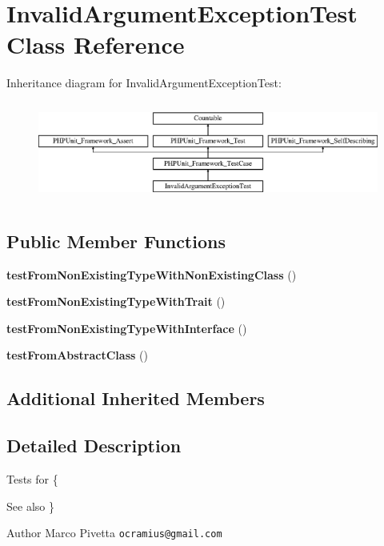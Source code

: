\section{Invalid\+Argument\+Exception\+Test Class Reference}
\label{class_doctrine_test_1_1_instantiator_test_1_1_exception_1_1_invalid_argument_exception_test}
Inheritance diagram for Invalid\+Argument\+Exception\+Test\+:\begin{figure}[H]
\begin{center}
\leavevmode
\includegraphics[height=3.303835cm]{class_doctrine_test_1_1_instantiator_test_1_1_exception_1_1_invalid_argument_exception_test}
\end{center}
\end{figure}
\subsection*{Public Member Functions}
\begin{DoxyCompactItemize}
\item 
{\bf test\+From\+Non\+Existing\+Type\+With\+Non\+Existing\+Class} ()
\item 
{\bf test\+From\+Non\+Existing\+Type\+With\+Trait} ()
\item 
{\bf test\+From\+Non\+Existing\+Type\+With\+Interface} ()
\item 
{\bf test\+From\+Abstract\+Class} ()
\end{DoxyCompactItemize}
\subsection*{Additional Inherited Members}


\subsection{Detailed Description}
Tests for \{\begin{DoxySeeAlso}{See also}
\}
\end{DoxySeeAlso}
\begin{DoxyAuthor}{Author}
Marco Pivetta {\tt ocramius@gmail.\+com}
\end{DoxyAuthor}


